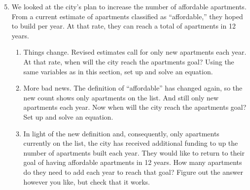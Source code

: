 \begin{enumerate} 
\setcounter{enumi}{4}

\item We looked at the city's plan to increase the number of affordable apartments.  From a current estimate of    apartments classified as ``affordable,'' they hoped to build  per year.  At that rate, they can reach a total of  apartments in 12 years.
\begin{enumerate}
\item Things change.  Revised estimates call for only  new apartments each year.  At that rate, when will the city reach the  apartments goal?  Using the same variables as in this section, set up and solve an equation.
\item More bad news.  The definition of ``affordable'' has changed again, so the new count shows only  apartments on the list.  And still only  new apartments each year.  Now when will the city reach the  apartments goal?  Set up and solve an equation.
\item In light of the new definition and, consequently, only  apartments currently on the list, the city has received additional funding to up the number of apartments built each year.  They would like to return to their goal of having  affordable apartments in 12 years.  How many apartments do they need to add each year to reach that goal?  Figure out the answer however you like, but check that it works.
\end{enumerate}


\end{enumerate}
